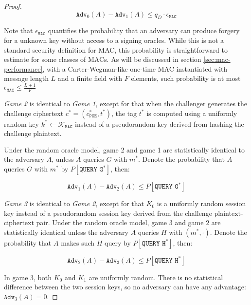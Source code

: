 \documentclass[floatrow,journal=tches,submission]{iacrtrans}
\newcommand{\pke}{\texttt{PKE}}
\newcommand{\mac}{\texttt{MAC}}
\begin{document}
\begin{proof}
    \begin{equation*}
        \texttt{Adv}_0(A) - \texttt{Adv}_1(A) \leq q_D \cdot \epsilon_\mac
    \end{equation*}

    Note that $\epsilon_\mac$ quantifies the probability that an adversary can produce forgery for a unknown key without access to a signing oracles. While this is not a standard security definition for MAC, this probability is straightforward to estimate for some classes of MACs. As will be discussed in section \ref{sec:mac-performance}, with a Carter-Wegman-like one-time MAC instantiated with message length $L$ and a finite field with $F$ elements, such probability is at most $\epsilon_\mac \leq \frac{L+1}{F}$

    \emph{Game 2} is identical to \emph{Game 1}, except for that when the challenger generates the challenge ciphertext $c^\ast = (c^\ast_\pke, t^\ast)$, the tag $t^\ast$ is computed using a uniformly random key $k^\ast \leftarrow \mathcal{K}_\mac$ instead of a pseudorandom key derived from hashing the challenge plaintext.

    Under the random oracle model, game 2 and game 1 are statistically identical to the adversary $A$, unless $A$ queries $G$ with $m^\ast$. Denote the probability that $A$ queries $G$ with $m^\ast$ by $P[\texttt{QUERY G}^\ast]$, then:

    \begin{equation*}
        \texttt{Adv}_1(A) - \texttt{Adv}_2(A) \leq P[\texttt{QUERY G}^\ast]
    \end{equation*}

    \emph{Game 3} is identical to \emph{Game 2}, except for that $K_0$ is a uniformly random session key instead of a pseudorandom session key derived from the challenge plaintext-ciphertext pair. Under the random oracle model, game 3 and game 2 are statistically identical unless the adversary $A$ queries $H$ with $(m^\ast, \cdot)$. Denote the probability that $A$ makes such $H$ query by $P[\texttt{QUERY H}^\ast]$, then:

    \begin{equation*}
        \texttt{Adv}_2(A) - \texttt{Adv}_3(A) \leq P[\texttt{QUERY H}^\ast]
    \end{equation*}

    In game 3, both $K_0$ and $K_1$ are uniformly random. There is no statistical difference between the two session keys, so no adversary can have any advantage: $\texttt{Adv}_3(A) = 0$.


\end{proof}
\end{document}
